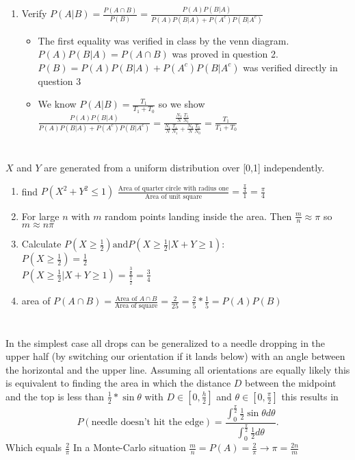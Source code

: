 \documentclass{article}
\begin{document}
\begin{enumerate}
\begin{itemize}
           \end{itemize}
       \item Verify $P(A|B) = \frac{P(A \cap B)}{P(B)} = \frac{P(A)P(B|A)}{P(A)P(B|A) + P(A^{c})P(B|A^{c})}$
           \begin{itemize}
           \item The first equality was verified in class by the venn diagram. $P(A)P(B|A) = P(A \cap B)$ was proved in question 2. $P(B) = P(A)P(B|A) + P(A^{c})P(B|A^{c})$ was verified directly in question 3 
           \item We know $P(A|B) = \frac{T_1}{T_1+T_0}$ so we show $\frac{P(A)P(B|A)}{P(A)P(B|A)+P(A^{c})P(B|A^{c})} = \frac{\frac{N_1}{N}\frac{T_1}{N_1}}{\frac{N_1}{N}\frac{T_1}{N_1}+\frac{N_0}{N}\frac{T_0}{N_0}} = \frac{T_1}{T_1+T_0}$
           \end{itemize}

       \end{enumerate}
    \section{}
    $X$ and $Y$ are generated from a uniform distribution over [0,1] independently.
    \begin{enumerate}
        \item find $P(X^2+Y^2 \leq 1)$ 
            $\frac{\text{Area of quarter circle with radius one}}{\text{Area of unit square}} = \frac{\frac{\pi}{4}}{1} = \frac{\pi}{4}$
        \item For large $n$ with $m$ random points landing inside the area. Then $\frac{m}{n} \approx  \pi$ so $m \approx n\pi$
    \item Calculate $P(X \geq \frac{1}{2}) \text{and} P(X \geq \frac{1}{2}|X+Y \geq 1)$:\\
        $P(X \geq \frac{1}{2}) = \frac{1}{2}$ \\$P(X \geq \frac{1}{2}|X+Y \geq 1) = \frac{\frac{3}{8}}{\frac{1}{2}} = \frac{3}{4}$
    \item area of $P(A \cap B) = \frac{\text{Area of $A \cap B$}}{\text{Area of square}} = \frac{2}{25} = \frac{2}{5}*\frac{1}{5} = P(A)P(B)$ 
    \end{enumerate}
    \section{}
    In the simplest case all drops can be generalized to a needle dropping in the upper half (by switching our orientation if it lands below)
    with an angle between the horizontal and the upper line. Assuming all orientations are equally likely this is
    equivalent to finding the area in which the distance $D$ between the midpoint and the top is less than $\frac{1}{2} * \sin{\theta}$ with $D \in [0,\frac{h}{2}]$ and $\theta \in [0,\frac{\pi}{2}]$
    this results in \[
        P(\text{needle doesn't hit the edge}) = \frac{\int_0^{\frac{\pi}{2}}\frac{1}{2}\sin{\theta}d\theta}{\int_0^{\frac{\pi}{2}}\frac{1}{2}d\theta}
    .\] Which equals $\frac{2}{\pi}$
    In a Monte-Carlo situation $\frac{m}{n} = P(A) = \frac{2}{\pi} \rightarrow \pi = \frac{2n}{m}$
\end{document}
